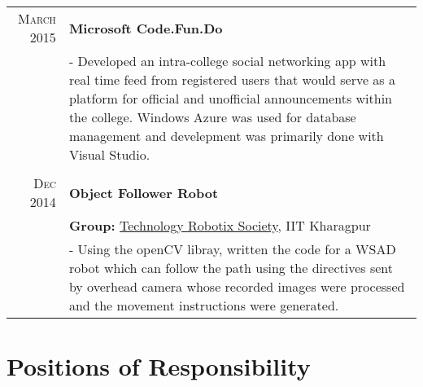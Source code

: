 \documentclass[a4paper,10pt]{extarticle} %
\begin{document}
\begin{tabular}{r|p{16cm}}
\textsc{March 2015} & \textbf{Microsoft Code.Fun.Do}\\
& \footnotesize{- Developed an intra-college social networking app with real time feed from registered users that would serve as a platform for official and unofficial announcements within the college. Windows Azure was used for database management and develepment was primarily done with Visual Studio.}\\
\multicolumn{2}{c}{} \\

\textsc{Dec 2014} & \textbf{Object Follower Robot} \\
& \textbf{Group: }\textmd{\href{http://www.robotix.in/}{Technology Robotix Society}}, IIT Kharagpur\\
& \footnotesize{- Using the openCV libray, written the code for a WSAD robot which can follow the path using the directives sent by overhead camera whose recorded images were processed and the movement instructions were generated.}\\

\end{tabular}



\section{Positions of Responsibility}
\end{document}
